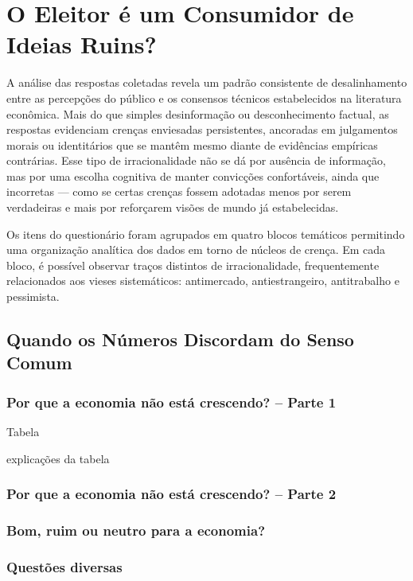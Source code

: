 


\chapter{O Eleitor é um Consumidor de Ideias Ruins?} 

A análise das respostas coletadas revela um padrão consistente de desalinhamento entre as percepções do público e os consensos técnicos estabelecidos na literatura econômica. Mais do que simples desinformação ou desconhecimento factual, as respostas evidenciam crenças enviesadas persistentes, ancoradas em julgamentos morais ou identitários que se mantêm mesmo diante de evidências empíricas contrárias. Esse tipo de irracionalidade não se dá por ausência de informação, mas por uma escolha cognitiva de manter convicções confortáveis, ainda que incorretas — como se certas crenças fossem adotadas menos por serem verdadeiras e mais por reforçarem visões de mundo já estabelecidas.

Os itens do questionário foram agrupados em quatro blocos temáticos permitindo uma organização analítica dos dados em torno de núcleos de crença. Em cada bloco, é possível observar traços distintos de irracionalidade, frequentemente relacionados aos vieses sistemáticos: antimercado, antiestrangeiro, antitrabalho e pessimista.

\section{Quando os Números Discordam do Senso Comum} 

\subsection{Por que a economia não está crescendo? – Parte 1}

Tabela

explicações da tabela

\subsection{Por que a economia não está crescendo? – Parte 2}

\subsection{Bom, ruim ou neutro para a economia?}

\subsection{Questões diversas}

